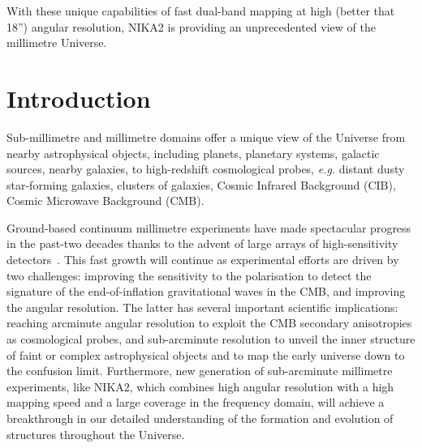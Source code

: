 \documentclass[traditionalabstract]{aa}
\newcommand{\lp}[1]{#1}
\newcommand{\rev}[1]{#1}
\begin{document}
       {With these unique capabilities of fast dual-band mapping at
         high (better that 18'') angular resolution, NIKA2 is providing an unprecedented view
         of the millimetre Universe.}      
       
   \maketitle
\section{Introduction}
\label{se:intro}
%
Sub-millimetre and millimetre domains offer a unique view of the
Universe from nearby astrophysical objects, including planets,
planetary systems, galactic sources, nearby galaxies, to high-redshift
cosmological probes, \emph{e.g.} distant dusty star-forming galaxies,
clusters of galaxies, Cosmic Infrared Background (CIB), Cosmic Microwave
Background (CMB).

Ground-based {\lp continuum} millimetre experiments have made spectacular progress in
the past-two decades thanks to the advent of large arrays of
high-sensitivity detectors~\citep{Wilson2008_AZTEC,
  Siringo2009_LABOCA, Staguhn2011_GISMO, Swetz2011_ACT, Monfardini2011_NIKA, Polarbear_2012, Bleem2012_SPT, Holland2013_SCUBA2,
  Dicker2014_MUSTANG2, BKS_2015, Adam2017, BICEP3_2018}. 
This fast growth will continue as experimental efforts are
driven by two challenges: improving the sensitivity to the
polarisation to detect the signature of
the end-of-inflation gravitational waves in the CMB, and {\rev
improving the angular resolution. The latter has several important
scientific implications: reaching arcminute angular resolution to
exploit the CMB secondary anisotropies as cosmological probes, and
sub-arcminute resolution to unveil the inner structure of faint or
complex astrophysical objects and to map the early universe down to
the confusion limit.}
Furthermore, new
generation of sub-arcminute millimetre experiments, like NIKA2, which
combines high angular resolution with a high mapping speed and a large
coverage in the frequency domain, will achieve a breakthrough in 
our detailed understanding of the formation and evolution of
structures throughout the Universe.
\end{document}
